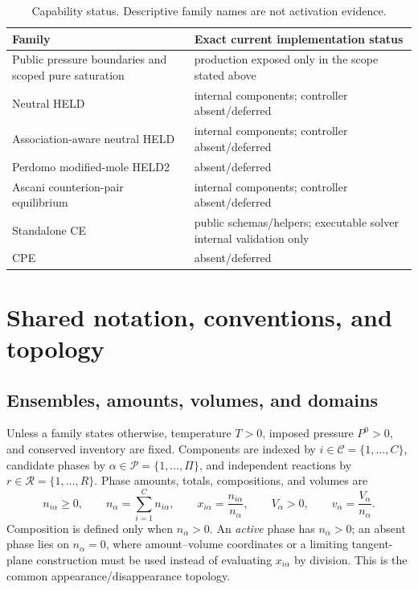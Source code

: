 \documentclass[11pt]{article}
\begin{document}
\begin{table}[htbp]
\centering
\small
\begin{tabularx}{\textwidth}{>{\raggedright\arraybackslash}p{}X}
\toprule
Family & Exact current implementation status \\
\midrule
Public pressure boundaries and scoped pure saturation &
production exposed only in the scope stated above \\
Neutral HELD & internal components; controller absent/deferred \\
Association-aware neutral HELD & internal components; controller absent/deferred \\
Perdomo modified-mole HELD2 & absent/deferred \\
Ascani counterion-pair equilibrium & internal components; controller absent/deferred \\
Standalone CE & public schemas/helpers; executable solver internal validation only \\
CPE & absent/deferred \\
\bottomrule
\end{tabularx}
\caption{Capability status. Descriptive family names are not activation evidence.}
\label{tab:eqform:status}
\end{table}

\section{Shared notation, conventions, and topology}
\label{sec:eqform:shared}

\subsection{Ensembles, amounts, volumes, and domains}

Unless a family states otherwise, temperature \(T>0\), imposed pressure
\(P^0>0\), and conserved inventory are fixed. Components are indexed by
\(i\in\mathcal C=\{1,\ldots,C\}\), candidate phases by
\(\alpha\in\mathcal P=\{1,\ldots,\Pi\}\), and independent reactions by
\(r\in\mathcal R=\{1,\ldots,R\}\). Phase amounts, totals, compositions, and
volumes are
\begin{equation}
 n_{i\alpha}\geq 0,\qquad
 n_\alpha=\sum_{i=1}^{C}n_{i\alpha},\qquad
 x_{i\alpha}=\frac{n_{i\alpha}}{n_\alpha},\qquad
 V_\alpha>0,\qquad v_\alpha=\frac{V_\alpha}{n_\alpha}.
\label{eq:eqform:phase-definitions}
\end{equation}
Composition is defined only when \(n_\alpha>0\). An \emph{active} phase has
\(n_\alpha>0\); an absent phase lies on \(n_\alpha=0\), where amount--volume
coordinates or a limiting tangent-plane construction must be used instead of
evaluating \(x_{i\alpha}\) by division. This is the common
appearance/disappearance topology.
\end{document}
